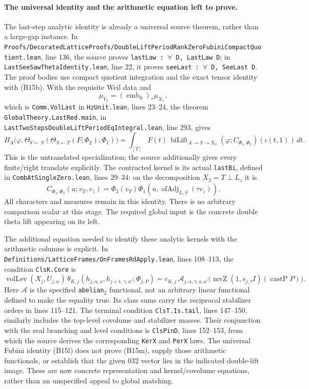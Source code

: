 \paragraph{The universal identity and the arithmetic equation left to prove.}
The last-step analytic identity is already a universal source theorem, rather than a large-gap instance. In \texttt{Proofs/\allowbreak{}DecoratedLatticeProofs/\allowbreak{}DoubleLiftPeriodRankZeroFubiniCompactQuotient.lean}, line 136, the source proves \texttt{lastLaw : \ensuremath{\forall} D, LastLaw D}; in \texttt{LastSeeSawThetaIdentity.lean}, line 22, it proves \texttt{seeLast : \ensuremath{\forall} D, SeeLast D}. The proof bodies use compact quotient integration and the exact tensor identity with (B15b). With the requisite Weil data and
\[
 \mu_{V_1}=(\operatorname{emb}_0)_*\mu_{X_1},
 \tag{B15k}
\]
which is \texttt{Comm.VolLast} in \texttt{HzUnit.lean}, lines 23--24, the theorem \texttt{GlobalTheory.LastRed.main}, in \texttt{LastTwoStepsDoubleLiftPeriodEqIntegral.lean}, line 293, gives
\[
 B_A\bigl(\varphi,
   \Theta_{V\leftarrow S}(\Theta_{S\leftarrow T}(F;\Phi_2);\Phi_1)\bigr)
  =\int_{[T]} F(t)\,
       \operatorname{biLift}_{A\to S\to X_2}
       (\varphi;C_{\Phi_1,\Phi_2})(\iota(t,1))\,dt.
 \tag{B15l}
\]
This is the untranslated specialization; the source additionally gives every finite/right translate explicitly. The contracted kernel is its actual \texttt{lastBi}, defined in \texttt{CombAtSingleZero.lean}, lines 29--34: on the decomposition $X_2=T\perp L_z$ it is
\[
 C_{\Phi_1,\Phi_2}(u;v_T,v_z)
       =\Phi_2(v_T)\Phi_1(u,\operatorname{ofAdj}_{L,S}(\tau v_z)).
\]
All characters and measures remain in this identity. There is no arbitrary comparison scalar at this stage. The required global input is the concrete double theta lift appearing on its left.

The additional equation needed to identify these analytic kernels with the arithmetic columns is explicit. In \texttt{Definitions/\allowbreak{}LatticeFrames/\allowbreak{}OnFramesRdApply.lean}, lines 108--113, the condition \texttt{ClsK.Core} is
\[
 \operatorname{volLev}(X_j,U_{j,\alpha})\,
 \theta_{K,j}(h_{j,\alpha,a},h_{j+1,\gamma,a'};\Phi_{j,P})
 =c_{K,j}\,\mathcal A_{j,\alpha,\gamma,a,a'}
       \bigl(\operatorname{mvZ}(1,s_{j,\tau}I)(\operatorname{castP}P)\bigr).
 \tag{B15m}
\]
Here $\mathcal A$ is the specified \texttt{abelian\ensuremath{_2}} functional, not an arbitrary linear functional defined to make the equality true. Its class sums carry the reciprocal stabilizer orders in lines 115--121. The terminal condition \texttt{ClsT.Is.tail}, lines 147--150, similarly includes the top-level covolume and stabilizer masses. Their conjunction with the real branching and level conditions is \texttt{ClsPinD}, lines 152--153, from which the source derives the corresponding \texttt{KerX} and \texttt{PerX} laws. The universal Fubini identity (B15l) does not prove (B15m), supply those arithmetic functionals, or establish that the given 032 vector lies in the indicated double-lift image. These are now concrete representation and kernel/covolume equations, rather than an unspecified appeal to global matching.
